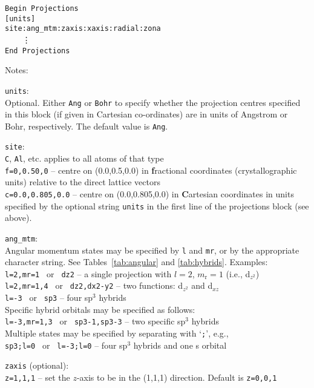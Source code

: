 \noindent
\verb#Begin Projections#\\
\verb#[units]#\\ 
\verb#site:ang_mtm:zaxis:xaxis:radial:zona#\\
\verb#    #\vdots\\
\verb#End Projections#

\noindent
Notes:

\noindent
\verb#units#:\\
Optional. Either \verb#Ang# or \verb#Bohr# to specify whether the
projection centres 
specified in this block (if given in Cartesian co-ordinates) are in
units of Angstrom or Bohr, respectively. The default value is \verb#Ang#.

\noindent
\verb#site#:\\
\verb#C#, \verb#Al#, etc. applies to all atoms of that type\\
\verb#f=0,0.50,0# -- centre on (0.0,0.5,0.0) in \textbf{f}ractional coordinates
(crystallographic units) relative to the direct lattice vectors \\
\verb#c=0.0,0.805,0.0# -- centre on (0.0,0.805,0.0) in \textbf{C}artesian
coordinates in units specified by the optional string \verb#units# in
the first line of the projections block (see above).

\noindent
\verb#ang_mtm#:\\
 Angular momentum states may be specified by \verb#l# and \verb#mr#,
 or by the appropriate character string. See Tables~\ref{tab:angular}
 and \ref{tab:hybrids}. Examples:\\
 \verb#l=2,mr=1 # or \verb# dz2# -- a single projection with $l=2$,
 $m_{\textrm{r}}=1$ (i.e., d$_{z^{2}}$)\\
 \verb#l=2,mr=1,4 # or \verb# dz2,dx2-y2# -- two functions: d$_{z^{2}}$ and d$_{xz}$\\
 \verb#l=-3 # or \verb# sp3# -- four sp$^{3}$ hybrids\\
 Specific hybrid orbitals may be specified as follows:\\
 \verb#l=-3,mr=1,3 # or \verb# sp3-1,sp3-3# -- two specific sp$^{3}$ hybrids\\
 Multiple states may be specified by separating with 
 `\verb#;#', e.g.,\\
 \verb#sp3;l=0 # or \verb# l=-3;l=0# -- four sp$^{3}$ hybrids and one s orbital

\noindent
\verb#zaxis# (optional):\\
\verb#z=1,1,1#  --  set the $z$-axis to be in the (1,1,1) direction. Default
is \verb#z=0,0,1# 

